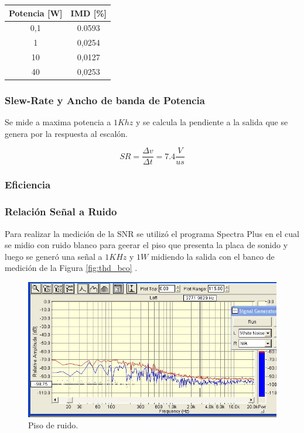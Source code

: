 			\begin{table}
				\begin{tabular}{cc}
				\toprule
				Potencia [W] & IMD [\%]\\
				\midrule
				0,1 & 0.0593 \\
				1 & 0,0254 \\
				10 & 0,0127 \\
				40 & 0,0253 \\
				\bottomrule
				\end{tabular}
			\end{table}



		\subsubsection{Slew-Rate y Ancho de banda de Potencia}
		Se mide a maxima potencia a $1Khz$ y se calcula la pendiente a la salida que se genera por la respuesta al escalón.

		\begin{equation*}
			SR  = \frac{\varDelta v}{\varDelta t} = 7.4 \frac{V}{us}
		\end{equation*}

		\subsubsection{Eficiencia}

		\subsubsection{Relación Señal a Ruido}
		Para realizar la medición de la SNR se utilizó el programa Spectra Plus en el cual se midio con ruido blanco para geerar el piso que presenta la placa de sonido y luego se generó una señal a $1KHz$ y $1W$ midiendo la salida con el banco de medición de la Figura \ref{fig:thd_bco} .



			\begin{figure}
				\centering
				\includegraphics[scale=0.6]{./Figuras/ruido_balnco.jpg}
			\caption{Piso de ruido.}
			\end{figure}

